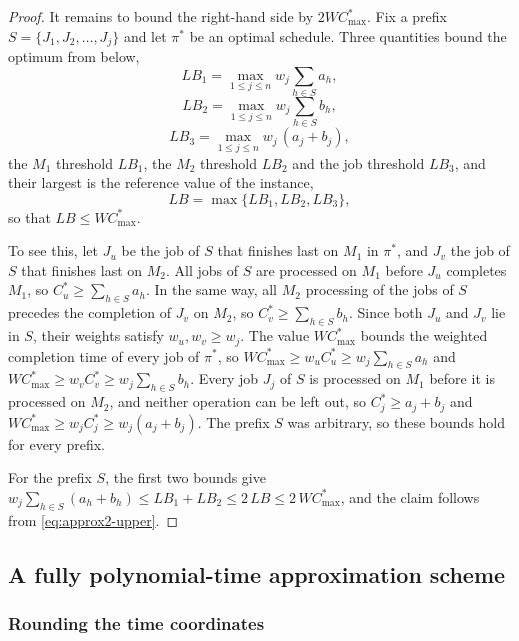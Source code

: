﻿\documentclass[12pt]{article}
\begin{document}
\begin{sloppypar}
\begin{proof}
It remains to bound the right-hand side by $2W C_{\max}^{*}$. Fix a prefix
$S=\{J_1,J_2,\dots,J_j\}$ and let $\pi^{*}$ be an optimal schedule. Three quantities bound the
optimum from below,
\begin{equation}\label{eq:lb1}
LB_1=\max_{1\le j\le n}w_j\sum_{h\in S}a_h,
\end{equation}
\begin{equation}\label{eq:lb2}
LB_2=\max_{1\le j\le n}w_j\sum_{h\in S}b_h,
\end{equation}
\begin{equation}\label{eq:lb3}
LB_3=\max_{1\le j\le n}w_j\,(a_j+b_j),
\end{equation}
the $M_1$ threshold $LB_1$, the $M_2$ threshold $LB_2$ and the job threshold $LB_3$, and their
largest is the reference value of the instance,
\begin{equation}\label{eq:lb}
LB=\max\{LB_1,LB_2,LB_3\},
\end{equation}
so that $LB\le W C_{\max}^{*}$.

To see this, let $J_u$ be the job of $S$ that finishes last on $M_1$ in $\pi^{*}$, and $J_v$ the
job of $S$ that finishes last on $M_2$. All jobs of $S$ are processed on $M_1$ before $J_u$
completes $M_1$, so $C^{*}_u\ge\sum_{h\in S}a_h$. In the same way, all $M_2$ processing of the
jobs of $S$ precedes the completion of $J_v$ on $M_2$, so $C^{*}_v\ge\sum_{h\in S}b_h$. Since
both $J_u$ and $J_v$ lie in $S$, their weights satisfy $w_u,w_v\ge w_j$. The value
$W C_{\max}^{*}$ bounds the weighted completion time of every job of $\pi^{*}$, so
$W C_{\max}^{*}\ge w_u C^{*}_u\ge w_j\sum_{h\in S}a_h$ and
$W C_{\max}^{*}\ge w_v C^{*}_v\ge w_j\sum_{h\in S}b_h$. Every job $J_j$ of $S$ is processed on
$M_1$ before it is processed on $M_2$, and neither operation can be left out, so
$C^{*}_j\ge a_j+b_j$ and $W C_{\max}^{*}\ge w_jC^{*}_j\ge w_j(a_j+b_j)$. The prefix $S$ was
arbitrary, so these bounds hold for every prefix.

For the prefix $S$, the first two bounds give
$w_j\sum_{h\in S}(a_h+b_h)\le LB_1+LB_2\le 2\,LB\le 2\,W C_{\max}^{*}$, and the claim
follows from \cref{eq:approx2-upper}.
\end{proof}

\subsection{A fully polynomial-time approximation scheme}
\label{sub:fptas}

\subsubsection{Rounding the time coordinates}
\label{subsub:fptas-time}


\end{sloppypar}
\end{document}
